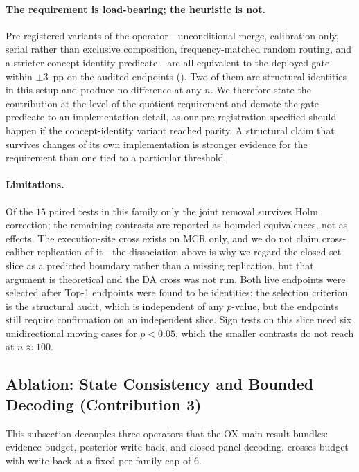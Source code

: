 \paragraph{The requirement is load-bearing; the heuristic is not.}
Pre-registered variants of the operator---unconditional merge, calibration only, serial rather than exclusive composition, frequency-matched random routing, and a stricter concept-identity predicate---are all equivalent to the deployed gate within $\pm 3$~pp on the audited endpoints ().
Two of them are structural identities in this setup and produce no difference at any $n$.
We therefore state the contribution at the level of the quotient requirement and demote the gate predicate to an implementation detail, as our pre-registration specified should happen if the concept-identity variant reached parity.
A structural claim that survives changes of its own implementation is stronger evidence for the requirement than one tied to a particular threshold.

\paragraph{Limitations.}
Of the $15$ paired tests in this family only the joint removal survives Holm correction; the remaining contrasts are reported as bounded equivalences, not as effects.
The execution-site cross exists on MCR only, and we do not claim cross-caliber replication of it---the dissociation above is why we regard the closed-set slice as a predicted boundary rather than a missing replication, but that argument is theoretical and the DA cross was not run.
Both live endpoints were selected after Top-1 endpoints were found to be identities; the selection criterion is the structural audit, which is independent of any $p$-value, but the endpoints still require confirmation on an independent slice.
Sign tests on this slice need six unidirectional moving cases for $p<0.05$, which the smaller contrasts do not reach at $n\approx100$.

\subsection{Ablation: State Consistency and Bounded Decoding (Contribution 3)}
\label{sec:res-state}

This subsection decouples three operators that the OX main result bundles: evidence budget, posterior write-back, and closed-panel decoding.
 crosses budget with write-back at a fixed per-family cap of $6$.

